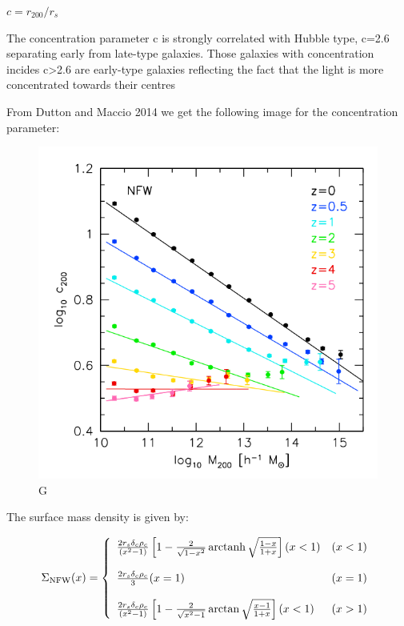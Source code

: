 $c=r_{200}/r_{s}$

The concentration parameter c is strongly correlated with Hubble type, c=2.6 separating early from late-type galaxies. Those galaxies with concentration incides c>2.6 are early-type galaxies reflecting the fact that the light is more concentrated towards their centres

From Dutton and Maccio 2014 we get the following image for the concentration parameter:

\begin{figure}[H]
\centering
\includegraphics[width=12cm]{images/dutton.png}
\caption[M]{G}
\end{figure}


The surface mass density is given by:

\begin{equation}
\Sigma_{\text{NFW}}(x) = \left\lbrace
\begin{array}{lll}
\frac{2r_{s}\delta_{c}\rho_{c}}{\left(x^{2}-1\right)}\left[1-\frac{2}{\sqrt{1-x^{2}}}\operatorname{arctanh}\sqrt{\frac{1-x}{1+x}}\right](x<1) & (x<1)\\\\
\frac{2r_{s}\delta_{c}\rho_{c}}{3}(x=1) & (x=1)\\\\
\frac{2r_{s}\delta_{c}\rho_{c}}{\left(x^{2}-1\right)}\left[1-\frac{2}{\sqrt{x^{2}-1}}\arctan\sqrt{\frac{x-1}{1+x}}\right](x<1) & (x>1)
\end{array}
\right.
\end{equation} 

